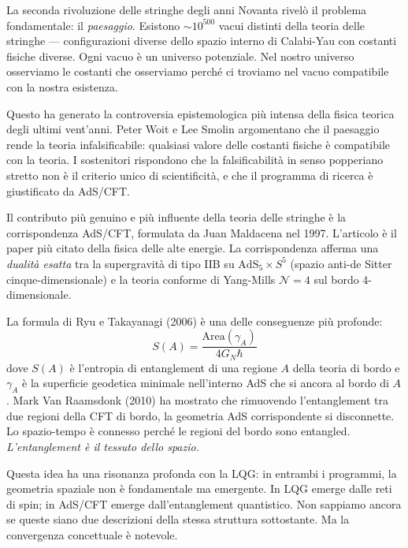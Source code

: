 \documentclass[12pt,a4paper,openany]{book}
\newcommand{\sezione}[1]{\vspace{1.2em}{\large\bfseries #1}\vspace{0.5em}\par}
\begin{document}
\sezione{Il paesaggio e il problema dell'infalsificabilità}

La seconda rivoluzione delle stringhe degli anni Novanta rivelò il problema fondamentale: il \textit{paesaggio}. Esistono $\sim 10^{500}$ vacui distinti della teoria delle stringhe — configurazioni diverse dello spazio interno di Calabi-Yau con costanti fisiche diverse. Ogni vacuo è un universo potenziale. Nel nostro universo osserviamo le costanti che osserviamo perché ci troviamo nel vacuo compatibile con la nostra esistenza.

Questo ha generato la controversia epistemologica più intensa della fisica teorica degli ultimi vent'anni. Peter Woit e Lee Smolin argomentano che il paesaggio rende la teoria infalsificabile: qualsiasi valore delle costanti fisiche è compatibile con la teoria. I sostenitori rispondono che la falsificabilità in senso popperiano stretto non è il criterio unico di scientificità, e che il programma di ricerca è giustificato da AdS/CFT.

\sezione{La corrispondenza AdS/CFT: il risultato più solido}

Il contributo più genuino e più influente della teoria delle stringhe è la corrispondenza AdS/CFT, formulata da Juan Maldacena nel 1997. L'articolo è il paper più citato della fisica delle alte energie. La corrispondenza afferma una \textit{dualità esatta} tra la supergravità di tipo IIB su $\mathrm{AdS}_5 \times S^5$ (spazio anti-de Sitter cinque-dimensionale) e la teoria conforme di Yang-Mills $\mathcal{N}=4$ sul bordo 4-dimensionale.

La formula di Ryu e Takayanagi (2006) è una delle conseguenze più profonde:
\[
S(A) = \frac{\mathrm{Area}(\gamma_A)}{4G_N\hbar}
\]
dove $S(A)$ è l'entropia di entanglement di una regione $A$ della teoria di bordo e $\gamma_A$ è la superficie geodetica minimale nell'interno AdS che si ancora al bordo di $A$. Mark Van Raamsdonk (2010) ha mostrato che rimuovendo l'entanglement tra due regioni della CFT di bordo, la geometria AdS corrispondente si disconnette. Lo spazio-tempo è connesso perché le regioni del bordo sono entangled. \textit{L'entanglement è il tessuto dello spazio.}

Questa idea ha una risonanza profonda con la LQG: in entrambi i programmi, la geometria spaziale non è fondamentale ma emergente. In LQG emerge dalle reti di spin; in AdS/CFT emerge dall'entanglement quantistico. Non sappiamo ancora se queste siano due descrizioni della stessa struttura sottostante. Ma la convergenza concettuale è notevole.
\end{document}

